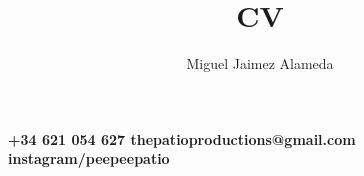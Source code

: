 \documentclass{article}
\renewcommand{\maketitle}{
  {\noindent\rmfamily\Huge\bfseries\MakeUppercase\theauthor}
  \vspace{.8em}
  }
\newcommand{\contacts}[3]{
  {\noindent\rmfamily\small\color{BodyGrey}\bfseries
    {\color{LightGrey}\faPhone}\hspace{5pt}#1\hspace{12pt}      %
    {\color{LightGrey}\faEnvelope}\hspace{5pt}#2\hspace{12pt}   %
    {\color{LightGrey}\faLink}\hspace{5pt}#3\hspace{12pt}       %
  }
}
\begin{document}

  \title{CV}
  \author{Miguel Jaimez Alameda}

  \maketitle

\contacts
  {+34 621 054 627}
  {thepatioproductions@gmail.com}
  {instagram/peepeepatio}

\color{BodyGrey}
\end{document}
